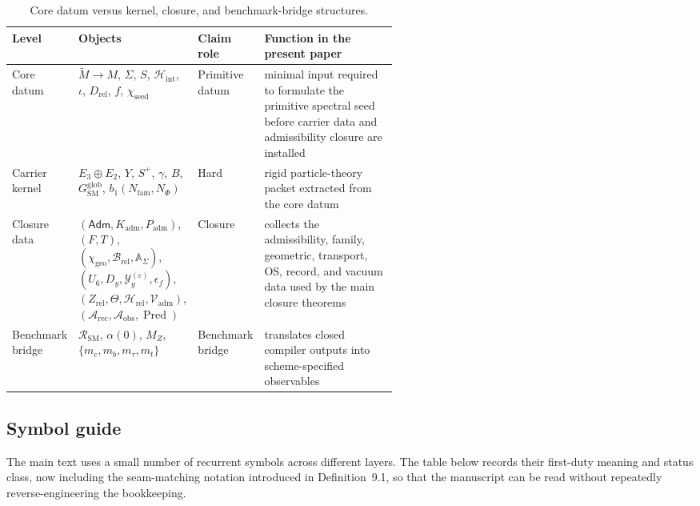 \documentclass[11pt,a4paper]{article}
\theoremstyle{definition}
\theoremstyle{remark}
\newcommand{\Seam}{\Sigma}
\newcommand{\inv}{\iota}
\newcommand{\bone}{b_1}
\newcommand{\SM}{\mathrm{SM}}
\newcommand{\Arec}{\mathcal A_{\mathrm{rec}}}
\newcommand{\Aobs}{\mathcal A_{\mathrm{obs}}}
\newcommand{\Vadm}{\mathcal V_{\mathrm{adm}}}
\newcommand{\Hrel}{\mathcal H_{\mathrm{rel}}}
\newcommand{\Pred}{\operatorname{Pred}}
\newcommand{\Hint}{\mathcal H_{\mathrm{int}}}
\newcommand{\Kadm}{K_{\mathrm{adm}}}
\newcommand{\chiseed}{\chi_{\mathrm{seed}}}
\newcommand{\chigeo}{\chi_{\mathrm{geo}}}
\newcommand{\Padm}{P_{\mathrm{adm}}}
\begin{document}
\begin{table}[t]
\centering
\small
\begin{tabularx}{\linewidth}{@{}>{\raggedright\arraybackslash}p{0.12\linewidth}>{\raggedright\arraybackslash}p{0.31\linewidth}>{\raggedright\arraybackslash}p{0.13\linewidth}Y@{}}
\toprule
Level & Objects & Claim role & Function in the present paper \\
\midrule
Core datum & $\widetilde M\to M$, $\Seam$, $S$, $\Hint$, $\inv$, $D_{\mathrm{rel}}$, $f$, $\chiseed$ & Primitive datum & minimal input required to formulate the primitive spectral seed before carrier data and admissibility closure are installed \\
Carrier kernel & $E_3\oplus E_2$, $Y$, $S^+$, $\gamma$, $B$, $G_{\SM}^{\mathrm{glob}}$, $\bone(N_{\mathrm{fam}},N_\Phi)$ & Hard & rigid particle-theory packet extracted from the core datum \\
Closure data & $(\mathsf{Adm},\Kadm,\Padm)$, $(F,T)$, $(\chigeo,\mathcal B_{\mathrm{rel}},\mathbb A_{\Seam})$, $(U_6,D_y,\mathcal Y_y^{(\varepsilon)},\epsilon_f)$, $(Z_{\mathrm{rel}},\Theta,\Hrel,\Vadm)$, $(\Arec,\Aobs,\Pred)$ & Closure & collects the admissibility, family, geometric, transport, OS, record, and vacuum data used by the main closure theorems \\
Benchmark bridge & $\mathcal R_{\SM}$, $\alpha(0)$, $M_Z$, $\{m_c,m_b,m_\tau,m_t\}$ & Benchmark bridge & translates closed compiler outputs into scheme-specified observables \\
\bottomrule
\end{tabularx}
\caption{Core datum versus kernel, closure, and benchmark-bridge structures.}
\label{tab:layered-datum}
\end{table}

\subsection{Symbol guide}

The main text uses a small number of recurrent symbols across different layers. The table below records their first-duty meaning and status class, now including the seam-matching notation introduced in Definition~9.1, so that the manuscript can be read without repeatedly reverse-engineering the bookkeeping.
\end{document}
